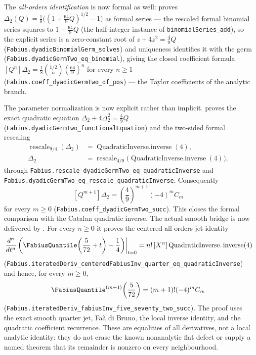 \documentclass[11pt,oneside]{article}
\numberwithin{equation}{section}
\theoremstyle{definition}
\theoremstyle{remark}
\begin{document}
\begin{obligation}
The \emph{all-orders identification} is now formal as well: 
proves $\Delta_2(Q)=\tfrac18\bigl((1+\tfrac{64}{9}Q)^{1/2}-1\bigr)$ as formal series ---
the rescaled formal binomial series squares to $1+\tfrac{64}{9}Q$ (the half-integer
instance of \nolinkurl{binomialSeries\_add}), so the explicit series is a zero-constant
root of $z+4z^2=\tfrac49Q$ (\nolinkurl{Fabius.dyadicBinomialGerm\_solves}) and uniqueness
identifies it with the germ (\nolinkurl{Fabius.dyadicGermTwo\_eq\_binomial}), giving the
closed coefficient formula $[Q^n]\Delta_2=\tfrac18\binom{1/2}{n}(\tfrac{64}{9})^n$ for every $n\ge1$
(\nolinkurl{Fabius.coeff\_dyadicGermTwo\_of\_pos}) --- the Taylor coefficients of the
analytic branch.

The parameter normalization is now explicit rather than implicit.
 proves the exact quadratic equation
$\Delta_2+4\Delta_2^2=\tfrac49Q$
(\nolinkurl{Fabius.dyadicGermTwo\_functionalEquation}) and the two-sided
formal rescaling
\[
 \begin{aligned}
 \operatorname{rescale}_{9/4}(\Delta_2)
   &=\operatorname{QuadraticInverse.inverse}(4),\\
 \Delta_2
   &=\operatorname{rescale}_{4/9}
      \bigl(\operatorname{QuadraticInverse.inverse}(4)\bigr),
 \end{aligned}
\]
through
\nolinkurl{Fabius.rescale\_dyadicGermTwo\_eq\_quadraticInverse} and
\nolinkurl{Fabius.dyadicGermTwo\_eq\_rescale\_quadraticInverse}.  Consequently
\[
 [Q^{m+1}]\Delta_2
   =\left(\frac49\right)^{m+1}(-4)^m C_m
\]
for every $m\ge0$
(\nolinkurl{Fabius.coeff\_dyadicGermTwo\_succ}).  This closes the formal
comparison with the Catalan quadratic inverse.  The actual smooth bridge is
now delivered by .  For every $n\ge0$ it
proves the centered all-orders jet identity
\[
 \left.\frac{d^n}{dt^n}
   \left(\FabiusQuantile\!\left(\frac5{72}+t\right)-\frac14\right)
 \right|_{t=0}
 =n!\,[X^n]\operatorname{QuadraticInverse.inverse}(4)
\]
(\nolinkurl{Fabius.iteratedDeriv\_centeredFabiusInv\_quarter\_eq\_quadraticInverse})
and hence, for every $m\ge0$,
\[
 \FabiusQuantile^{(m+1)}\!\left(\frac5{72}\right)
   =(m+1)!(-4)^m C_m
\]
(\nolinkurl{Fabius.iteratedDeriv\_fabiusInv\_five\_seventy\_two\_succ}).
The proof uses the exact smooth quarter jet, Fa\`a di Bruno, the local inverse
identity, and the quadratic coefficient recurrence.  These are equalities of
all derivatives, not a local analytic identity: they do not erase the known
nonanalytic flat defect or supply a named theorem that its remainder is
nonzero on every neighbourhood.


\end{obligation}
\end{document}
